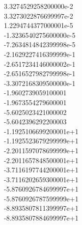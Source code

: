 \begin{description}
                            \noindent
 3.3274529258200000e-2    \\
 3.3273022876699997e-2    \\
 1.2294744377000001e-5    \\
 -1.3236540275600000e-5    \\
 -7.2634814842399998e-5    \\
 -2.1629227416399999e-1    \\
 -2.6517234146000002e-1    \\
 -2.6516527982799998e-1    \\
 -3.3072168309500000e-1    \\
 -1.9602739059100001    \\
 -1.9673554279600001    \\
 -5.6025023421000002    \\
 -5.6042396292200003    \\
 -1.1925106699200001e+1    \\
 -1.1925523679299999e+1    \\
 -2.2011597078699999e+1    \\
 -2.2011657848500001e+1    \\
 -3.7116197744200001e+1    \\
 -3.7116202659300001e+1    \\
 -5.8760926784699997e+1    \\
 -5.8760926787599999e+1    \\
 -8.8935807811399997e+1    \\
 -8.8935807884699997e+1    \\

\end{description}
